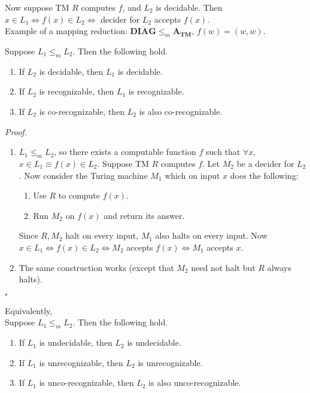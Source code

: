 \documentclass[a4paper]{article}
\newenvironment{proof}{\begin{breakbox}\textit{Proof.}}{\hfill$\square$\end{breakbox}}
\newcommand{\nl}{\vspace{0.2cm}\\}
\newcommand{\mf}{\mathbf}
\newcommand{\comp}{\overline}
\begin{document}
Now suppose TM $R$ computes $f$, and $L_2$ is decidable. Then $x \in L_1 \iff f(x) \in L_2 \iff$ decider for $L_2$ accepts $f(x)$.\nl

Example of a mapping reduction: $\comp{\mf{DIAG}} \le_m \mf{A_{TM}}$, $f(w) = (w, w)$.\nl

\begin{theorem}
    Suppose $L_1 \le_m L_2$. Then the following hold.
    \begin{enumerate}
        \item If $L_2$ is decidable, then $L_1$ is decidable.
        \item If $L_2$ is recognizable, then $L_1$ is recognizable.
        \item If $L_2$ is co-recognizable, then $L_2$ is also co-recognizable.
    \end{enumerate}
\end{theorem}

\begin{proof}
    \begin{enumerate}
        \item $L_1 \le_m L_2$, so there exists a computable function $f$ such that $\forall x$, $x \in L_1 \equiv f(x) \in L_2$. Suppose TM $R$ computes $f$. Let $M_2$ be a decider for $L_2$. Now
            consider the Turing machine $M_1$ which on input $x$ does the following:
            \begin{enumerate}
                \item Use $R$ to compute $f(x)$.
                \item Run $M_2$ on $f(x)$ and return its answer.
            \end{enumerate}
            Since $R, M_2$ halt on every input, $M_1$ also halts on every input.
            Now $x \in L_1 \iff f(x) \in L_2 \iff M_2$ accepts $f(x) \iff M_1$ accepts $x$.
        \item The same construction works (except that $M_2$ need not halt but $R$ always halts).
    \end{enumerate}
\end{proof}

\begin{theorem}
    Equivalently,\nl
    Suppose $L_1 \le_m L_2$. Then the following hold.
    \begin{enumerate}
        \item If $L_1$ is undecidable, then $L_2$ is undecidable.
        \item If $L_1$ is unrecognizable, then $L_2$ is unrecognizable.
        \item If $L_1$ is unco-recognizable, then $L_2$ is also unco-recognizable.
    \end{enumerate}
\end{theorem}
\end{document}
